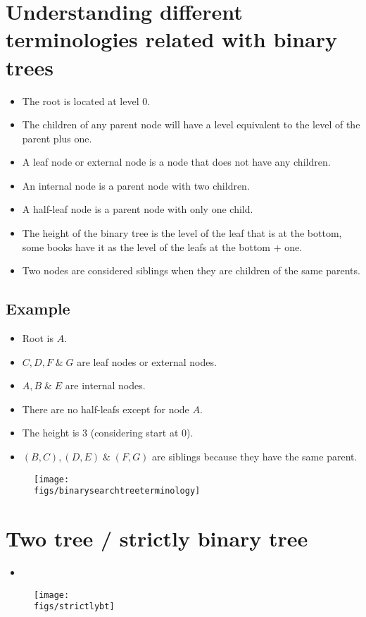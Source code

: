 \section{Understanding different terminologies related with binary trees}
\begin{itemize}
    \item The root is located at level 0.
    \item The children of any parent node will have a level equivalent to the level of the parent plus one. 
    \item A leaf node or external node is a node that does not have any children.
    \item An internal node is a parent node with two children. 
    \item A half-leaf node is a parent node with only one child.
    \item The height of the binary tree is the level of the leaf that is at the bottom, some books have it as the level of the leafs at the bottom + one. 
    \item Two nodes are considered siblings when they are children of the same parents. 
\end{itemize}

\subsection{Example}
\begin{itemize}
    \item Root is $A$. 
    \item $C,D,F\;\&\;G$ are leaf nodes or external nodes. 
    \item $A,B\;\&\;E$ are internal nodes. 
    \item There are no half-leafs except for node $A$.
    \item The height is 3 (considering start at 0).
    \item $(B,C),(D,E)\;\&\;(F,G)$ are siblings because they have the same parent.
\end{itemize}
\begin{figure}[H]
    \centering
    \texttt{[image: \\figs/binarysearchtreeterminology]}
\end{figure}

\section{Two tree / strictly binary tree}
\begin{itemize}
    \item {} 
\end{itemize}
\begin{figure}[H]
    \centering
    \texttt{[image: \\figs/strictlybt]}
\end{figure}

